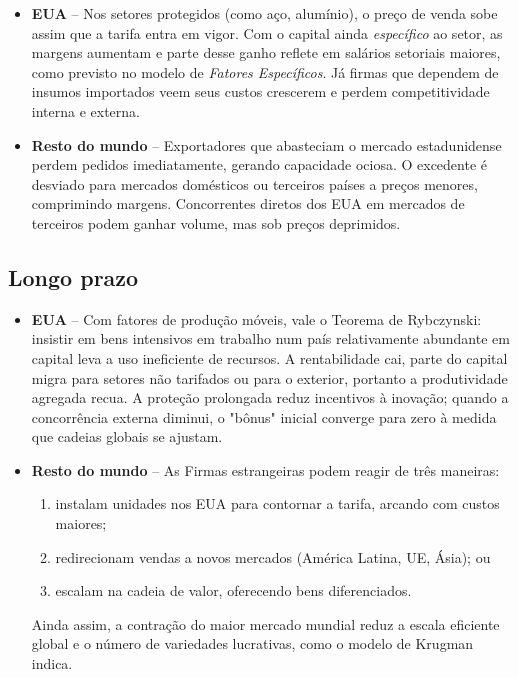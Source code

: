 \documentclass[a4paper,12pt]{article}[abntex2]
\begin{document}
\begin{itemize}
  \item \textbf{EUA} – Nos setores protegidos (como aço, alumínio), o preço de venda sobe assim que a tarifa entra em vigor. Com o capital ainda \emph{específico} ao setor, as margens aumentam e parte desse ganho reflete em salários setoriais maiores, como previsto no modelo de \textit{Fatores Específicos}. Já firmas que dependem de insumos importados veem seus custos crescerem e perdem competitividade interna e externa.

  \item \textbf{Resto do mundo} – Exportadores que abasteciam o mercado estadunidense perdem pedidos imediatamente, gerando capacidade ociosa. O excedente é desviado para mercados domésticos ou terceiros países a preços menores, comprimindo margens. Concorrentes diretos dos EUA em mercados de terceiros podem ganhar volume, mas sob preços deprimidos.
\end{itemize}

\subsection*{\textbf{Longo prazo}}

\begin{itemize}
  \item \textbf{EUA} – Com fatores de produção móveis, vale o Teorema de Rybczynski: insistir em bens intensivos em trabalho num país relativamente abundante em capital leva a uso ineficiente de recursos. A rentabilidade cai, parte do capital migra para setores não tarifados ou para o exterior, portanto a produtividade agregada recua. A proteção prolongada reduz incentivos à inovação; quando a concorrência externa diminui, o "bônus" inicial converge para zero à medida que cadeias globais se ajustam.
  
  \item \textbf{Resto do mundo} – As Firmas estrangeiras podem reagir de três maneiras: 
  \begin{enumerate}
    \item instalam unidades nos EUA para contornar a tarifa, arcando com custos maiores; 
    \item redirecionam vendas a novos mercados (América Latina, UE, Ásia); ou 
    \item escalam na cadeia de valor, oferecendo bens diferenciados. 
  \end{enumerate}
  
  Ainda assim, a contração do maior mercado mundial reduz a escala eficiente global e o número de variedades lucrativas, como o modelo de Krugman indica.
\end{itemize}
\end{document}

